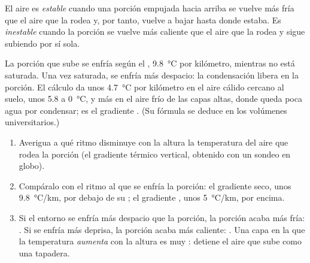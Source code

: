 \begin{definition}\label{def:g10:why-clouds-form:stability}
El aire es \emph{estable} cuando una porción empujada
hacia arriba se vuelve más fría que el aire que la rodea y, por tanto,
vuelve a bajar hasta donde estaba. Es \emph{inestable}
cuando la porción se vuelve más caliente que el aire que la rodea y sigue
subiendo por sí sola.
\end{definition}

La porción que sube se enfría según el ,
\qty{9.8}{\degreeCelsius} por kilómetro, mientras no está saturada. Una vez
saturada, se enfría más despacio: la condensación libera  en la
porción. El cálculo da unos \qty{4.7}{\degreeCelsius} por kilómetro en el
aire cálido cercano al suelo, unos \num{5.8} a \qty{0}{\degreeCelsius}, y
más en el aire frío de las capas altas, donde queda poca agua por
condensar; es el gradiente . (Su fórmula se deduce en los volúmenes
universitarios.)

\begin{method}\label{met:g10:why-clouds-form:stable}
\begin{enumerate}
  \item Averigua a qué ritmo disminuye con la altura la temperatura del aire
        que rodea la porción (el gradiente térmico vertical, obtenido con un
        sondeo en globo).
  \item Compáralo con el ritmo al que se enfría la porción: el gradiente
        seco, unos \qty{9.8}{\degreeCelsius/km}, por debajo de su ; el gradiente , unos
        \qty{5}{\degreeCelsius/km}, por encima.
  \item Si el entorno se enfría más despacio que la porción, la porción
        acaba más fría: . Si se enfría más deprisa, la porción acaba
        más caliente: . Una capa en la que la temperatura
        \emph{aumenta} con la altura es muy : detiene el aire que
        sube como una tapadera.
\end{enumerate}
\end{method}

